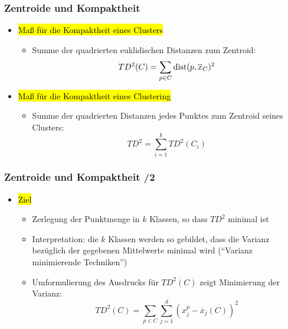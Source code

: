 \begin{frame}
\frametitle{Zentroide und Kompaktheit}

\begin{itemize}
\item \hl{Maß für die Kompaktheit eines Clusters}
\begin{itemize}
\item Summe der quadrierten euklidischen Distanzen zum Zentroid: 
$$TD^2(C) = \sum_{p \in C} \operatorname{dist}(p, \overline{x}_C)^2$$
\end{itemize}
\item \hl{Maß für die Kompaktheit eines Clustering}
\begin{itemize}
\item Summe der quadrierten Distanzen jedes Punktes zum Zentroid seines
Clusters: 
$$TD^2=\sum_{i=1}^k TD^2(C_i)$$
\end{itemize}

\end{itemize}

\end{frame}


\begin{frame}
\frametitle{Zentroide und Kompaktheit /2}

\begin{itemize}
\item \hl{Ziel}
\begin{itemize}
\item Zerlegung der Punktmenge in $k$ Klassen, so dass $TD^2$ minimal ist 
\item Interpretation: die $k$ Klassen werden so gebildet, dass die
  Varianz bezüglich der gegebenen Mittelwerte minimal wird ("`Varianz
  minimierende Techniken"')  
\item Umformulierung des Ausdrucks für $TD^2(C)$ zeigt Minimierung der
 Varianz: 
$$TD^2(C) = \sum_{p \in C}\sum_{j=1}^d (x^p_j - \overline{x}_j(C))^2$$
\end{itemize}
\end{itemize}

\end{frame}


